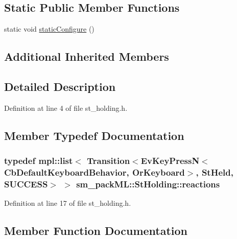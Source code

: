 \subsection*{Static Public Member Functions}
\begin{DoxyCompactItemize}
\item 
static void \hyperlink{structsm__packML_1_1StHolding_a3603a3a25ae5928eb1a39a480426a1b0}{static\+Configure} ()
\end{DoxyCompactItemize}
\subsection*{Additional Inherited Members}


\subsection{Detailed Description}


Definition at line 4 of file st\+\_\+holding.\+h.



\subsection{Member Typedef Documentation}
\subsubsection[{\texorpdfstring{reactions}{reactions}}]{\setlength{\rightskip}{0pt plus 5cm}typedef mpl\+::list$<$ Transition$<$Ev\+Key\+PressN$<$Cb\+Default\+Keyboard\+Behavior, {\bf Or\+Keyboard}$>$, {\bf St\+Held}, {\bf S\+U\+C\+C\+E\+SS}$>$ $>$ {\bf sm\+\_\+pack\+M\+L\+::\+St\+Holding\+::reactions}}\hypertarget{structsm__packML_1_1StHolding_a1189afef659b1cb4e7b5e0b0024ce362}{}\label{structsm__packML_1_1StHolding_a1189afef659b1cb4e7b5e0b0024ce362}


Definition at line 17 of file st\+\_\+holding.\+h.



\subsection{Member Function Documentation}

